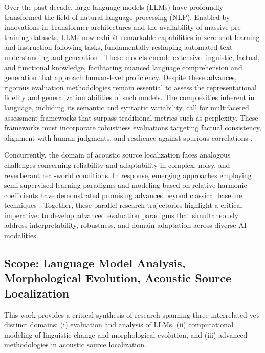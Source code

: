 \documentclass[11pt]{article}
\begin{document}
Over the past decade, large language models (LLMs) have profoundly transformed the field of natural language processing (NLP). Enabled by innovations in Transformer architectures and the availability of massive pre-training datasets, LLMs now exhibit remarkable capabilities in zero-shot learning and instruction-following tasks, fundamentally reshaping automated text understanding and generation \cite{ref10}. These models encode extensive linguistic, factual, and functional knowledge, facilitating nuanced language comprehension and generation that approach human-level proficiency. Despite these advances, rigorous evaluation methodologies remain essential to assess the representational fidelity and generalization abilities of such models. The complexities inherent in language, including its semantic and syntactic variability, call for multifaceted assessment frameworks that surpass traditional metrics such as perplexity. These frameworks must incorporate robustness evaluations targeting factual consistency, alignment with human judgments, and resilience against spurious correlations \cite{ref1}.

Concurrently, the domain of acoustic source localization faces analogous challenges concerning reliability and adaptability in complex, noisy, and reverberant real-world conditions. In response, emerging approaches employing semi-supervised learning paradigms and modeling based on relative harmonic coefficients have demonstrated promising advances beyond classical baseline techniques \cite{ref2, ref3, ref26}. Together, these parallel research trajectories highlight a critical imperative: to develop advanced evaluation paradigms that simultaneously address interpretability, robustness, and domain adaptation across diverse AI modalities.

\subsection{Scope: Language Model Analysis, Morphological Evolution, Acoustic Source Localization}

This work provides a critical synthesis of research spanning three interrelated yet distinct domains: (i) evaluation and analysis of LLMs, (ii) computational modeling of linguistic change and morphological evolution, and (iii) advanced methodologies in acoustic source localization.
\end{document}
